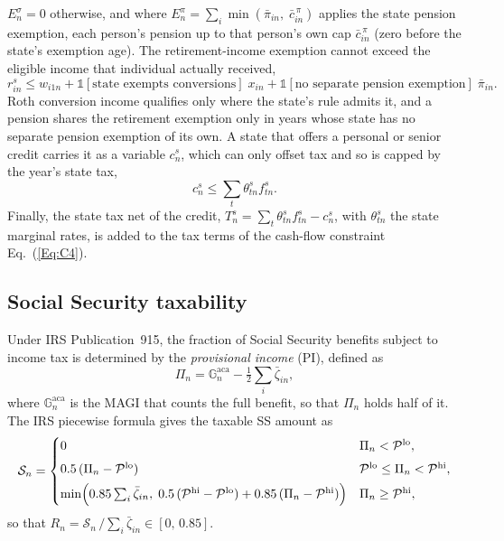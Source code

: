 \documentclass[fleqn,12pt]{report}
\begin{document}
	$E^{\sigma}_n = 0$ otherwise, and where
	$E^{\pi}_n = \sum_i \min\left(\bar{\pi}_{in},\; \bar{c}^{\,\pi}_{in}\right)$
	applies the state pension exemption, each person's pension up to that person's own
	cap $\bar{c}^{\,\pi}_{in}$ (zero before the state's exemption age).
	The retirement-income exemption cannot exceed the eligible income that
	individual actually received,
	\begin{equation}
		\label{Eq:StateREcap}
		r^{s}_{in} \le w_{i1n}
			+ \mathbb{1}[\text{state exempts conversions}]\; x_{in}
			+ \mathbb{1}[\text{no separate pension exemption}]\; \bar{\pi}_{in}.
	\end{equation}
	Roth conversion income qualifies only where the state's rule admits it, and a pension
	shares the retirement exemption only in years whose state has no separate pension
	exemption of its own.
	A state that offers a personal or senior credit carries it as a variable $c^{s}_n$,
	which can only offset tax and so is capped by the year's state tax,
	\begin{equation}
		\label{Eq:StateCredit}
		c^{s}_n \le \sum_{t} \theta^{s}_{tn} f^{s}_{tn}.
	\end{equation}
	Finally, the state tax net of the credit, $T^{s}_n = \sum_t \theta^{s}_{tn} f^{s}_{tn} - c^{s}_n$, with
	$\theta^{s}_{tn}$ the state marginal rates, is added to the tax terms of the
	cash-flow constraint Eq.~(\ref{Eq:C4}).

\subsection{Social Security taxability}
	Under IRS Publication~915, the fraction of Social Security benefits subject to income
	tax is determined by the \emph{provisional income} (PI), defined as
	\begin{equation}
		\label{Eq:PI}
		\Pi_n = \mathbb{G}^{\mathrm{aca}}_n - \tfrac{1}{2}\sum_i\bar{\zeta}_{in},
	\end{equation}
	where $\mathbb{G}^{\mathrm{aca}}_n$ is the MAGI that counts the full benefit, so that
	$\Pi_n$ holds half of it.
	The IRS piecewise formula gives the taxable SS amount as
	\begin{equation}
		\label{Eq:TaxableSS}
		\mathcal{S}_n = \begin{cases}
			0 & \Pi_n < \mathcal{P}^{\mathrm{lo}}, \\[4pt]
			0.5\,(\Pi_n - \mathcal{P}^{\mathrm{lo}}) & \mathcal{P}^{\mathrm{lo}} \le \Pi_n < \mathcal{P}^{\mathrm{hi}}, \\[4pt]
			\min\Bigl(0.85\sum_i\bar{\zeta}_{in},\;
			      0.5\,(\mathcal{P}^{\mathrm{hi}}-\mathcal{P}^{\mathrm{lo}})
			      + 0.85\,(\Pi_n - \mathcal{P}^{\mathrm{hi}})\Bigr) & \Pi_n \ge \mathcal{P}^{\mathrm{hi}},
		\end{cases}
	\end{equation}
	so that $R_n = \mathcal{S}_n\,/\sum_i\bar{\zeta}_{in} \in [0,\,0.85]$.
\end{document}

